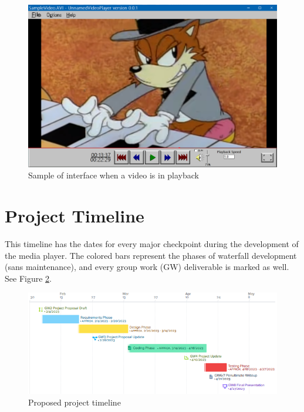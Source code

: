 \documentclass[10pt,conference,onecolumn,compsoc]{IEEEtran}
\begin{document}

\begin{figure}[H]
\begin{center}
\includegraphics[scale=.7]{PlayerMockup.png}
\caption{Sample of interface when a video is in playback}
\label{PlayerMockup}
\end{center}
\end{figure}

\clearpage
\section{Project Timeline}
This timeline has the dates for every major checkpoint during the development of the media player. The colored bars represent the phases of waterfall development (sans maintenance), and every group work (GW) deliverable is marked as well.
See Figure \ref{timeline}.

\begin{figure}[H]
\begin{center}
\includegraphics[scale=1.5]{Project_Timeline.png}
\caption{Proposed project timeline}
\label{timeline}
\end{center}
\end{figure}
\end{document}
